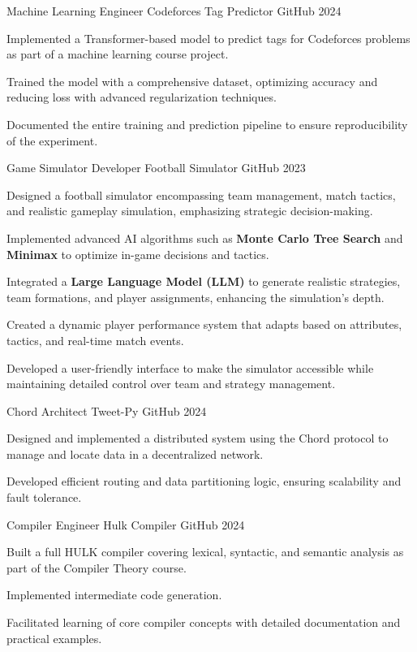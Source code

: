 \begin{cventries}
    \cventry
    {Machine Learning Engineer}
    {Codeforces Tag Predictor}
    {GitHub}
    {2024}
    {
      \begin{cvitems}
        \item {Implemented a Transformer-based model to predict tags for Codeforces problems as part of a machine learning course project.}
        \item {Trained the model with a comprehensive dataset, optimizing accuracy and reducing loss with advanced regularization techniques.}
        \item {Documented the entire training and prediction pipeline to ensure reproducibility of the experiment.}
      \end{cvitems}
    }
    \cventry
    {Game Simulator Developer}
    {Football Simulator}
    {GitHub}
    {2023}
    {
      \begin{cvitems}
        \item {Designed a football simulator encompassing team management, match tactics, and realistic gameplay simulation, emphasizing strategic decision-making.}
        \item {Implemented advanced AI algorithms such as \textbf{Monte Carlo Tree Search} and \textbf{Minimax} to optimize in-game decisions and tactics.}
        \item {Integrated a \textbf{Large Language Model (LLM)} to generate realistic strategies, team formations, and player assignments, enhancing the simulation’s depth.}
        \item {Created a dynamic player performance system that adapts based on attributes, tactics, and real-time match events.}
        \item {Developed a user-friendly interface to make the simulator accessible while maintaining detailed control over team and strategy management.}
      \end{cvitems}
    }
    \cventry
    {Chord Architect}
    {Tweet-Py}
    {GitHub}
    {2024}
    {
      \begin{cvitems}
        \item {Designed and implemented a distributed system using the Chord protocol to manage and locate data in a decentralized network.}
        \item {Developed efficient routing and data partitioning logic, ensuring scalability and fault tolerance.}
      \end{cvitems}
    }
  \cventry
    {Compiler Engineer}
    {Hulk Compiler}
    {GitHub}
    {2024}
    {
      \begin{cvitems}
        \item {Built a full HULK compiler covering lexical, syntactic, and semantic analysis as part of the Compiler Theory course.}
        \item {Implemented intermediate code generation.}
        \item {Facilitated learning of core compiler concepts with detailed documentation and practical examples.}
      \end{cvitems}
    }


\end{cventries}
